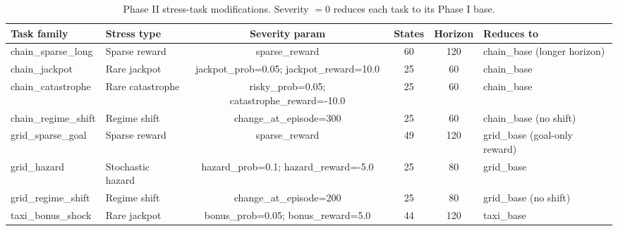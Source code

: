 \begin{table}[t]
\centering
\caption{Phase II stress-task modifications.  Severity $= 0$ reduces each task to its Phase I base.}
\label{tab:p2a}
\small
\begin{tabular}{llcccp{3.5cm}}
\toprule
Task family & Stress type & Severity param & States & Horizon & Reduces to \\
\midrule
  chain\_sparse\_long & Sparse reward & sparse\_reward & 60 & 120 & chain\_base (longer horizon) \\
  chain\_jackpot & Rare jackpot & jackpot\_prob=0.05; jackpot\_reward=10.0 & 25 & 60 & chain\_base \\
  chain\_catastrophe & Rare catastrophe & risky\_prob=0.05; catastrophe\_reward=-10.0 & 25 & 60 & chain\_base \\
  chain\_regime\_shift & Regime shift & change\_at\_episode=300 & 25 & 60 & chain\_base (no shift) \\
  grid\_sparse\_goal & Sparse reward & sparse\_reward & 49 & 120 & grid\_base (goal-only reward) \\
  grid\_hazard & Stochastic hazard & hazard\_prob=0.1; hazard\_reward=-5.0 & 25 & 80 & grid\_base \\
  grid\_regime\_shift & Regime shift & change\_at\_episode=200 & 25 & 80 & grid\_base (no shift) \\
  taxi\_bonus\_shock & Rare jackpot & bonus\_prob=0.05; bonus\_reward=5.0 & 44 & 120 & taxi\_base \\
\bottomrule
\end{tabular}
\end{table}
